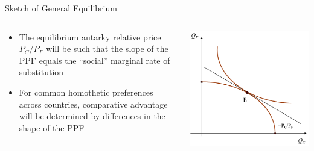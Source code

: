 \documentclass[10pt,hyperref={CJKbookmarks=true},xcolor=dvipsnames,aspectratio=169]{beamer}
\begin{document}
\begin{frame}{Sketch of General Equilibrium}


\begin{columns}[onlytextwidth]
\begin{column}{0.5\textwidth}
\begin{itemize}
\item The equilibrium autarky relative price $P_{C}/P_{F}$ will be such
that the slope of the PPF equals the “social” marginal rate of substitution 
\item For common homothetic preferences across countries, comparative advantage will be determined by differences in the shape of the PPF 
\end{itemize}

\end{column}
\begin{column}{0.5\textwidth}
\includegraphics[width=0.9\columnwidth]{fig/ho/lec5-8}
\end{column}
\end{columns}

\end{frame}
\end{document}
